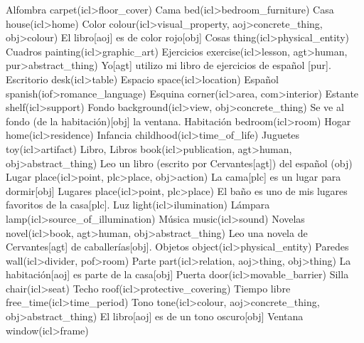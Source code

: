 \documentclass{article}
\begin{document}
{
    \uw
    {Alfombra}
    {carpet(icl>floor\_cover)}
    {}
    \uw
    {Cama}
    {bed(icl>bedroom\_furniture)}
    {}
    \uw
    {Casa}
    {house(icl>home)}
    {}
    \uw
    {Color}
    {colour(icl>visual\_property, aoj>concrete\_thing, obj>colour)}
    {El libro[aoj] es de color rojo[obj]}
    \uw
    {Cosas}
    {thing(icl>physical\_entity)}
    {}
    \uw
    {Cuadros}
    {painting(icl>graphic\_art)}
    {}
    \uw
    {Ejercicios}
    {exercise(icl>lesson, agt>human, pur>abstract\_thing)}
    {Yo[agt] utilizo mi libro de ejercicios de español [pur].}
    \uw
    {Escritorio}
    {desk(icl>table)}
    {}
    \uw
    {Espacio}
    {space(icl>location)}
    {}
    \uw
    {Español}
    {spanish(iof>romance\_language)}
    {}
    \uw
    {Esquina}
    {corner(icl>area, com>interior)}
    {}
    \uw
    {Estante}
    {shelf(icl>support)}
    {}
    \uw
    {Fondo}
    {background(icl>view, obj>concrete\_thing)}
    {Se ve al fondo (de la habitación)[obj] la ventana.}
    \uw
    {Habitación}
    {bedroom(icl>room)}
    {}
    \uw
    {Hogar}
    {home(icl>residence)}
    {}
    \uw
    {Infancia}
    {childhood(icl>time\_of\_life)}
    {}
    \uw
    {Juguetes}
    {toy(icl>artifact)}
    {}
    \uw
    {Libro, Libros}
    {book(icl>publication, agt>human, obj>abstract\_thing)}
    {Leo un libro (escrito por Cervantes[agt]) del español (obj)}
    \uw
    {Lugar}
    {place(icl>point, plc>place, obj>action)}
    {La cama[plc] es un lugar para dormir[obj]}
    \uw
    {Lugares}
    {place(icl>point, plc>place)}
    {El baño es uno de mis lugares favoritos de la casa[plc].}
    \uw
    {Luz}
    {light(icl>ilumination)}
    {}
    \uw
    {Lámpara}
    {lamp(icl>source\_of\_illumination)}
    {}
    \uw
    {Música}
    {music(icl>sound)}
    {}
    \uw
    {Novelas}
    {novel(icl>book, agt>human, obj>abstract\_thing)}
    {Leo una novela de Cervantes[agt] de caballerías[obj].}
    \uw
    {Objetos}
    {object(icl>physical\_entity)}
    {}
    \uw
    {Paredes}
    {wall(icl>divider, pof>room)}
    {}
    \uw
    {Parte}
    {part(icl>relation, aoj>thing, obj>thing)}
    {La habitación[aoj] es parte de la casa[obj]}
    \uw
    {Puerta}
    {door(icl>movable\_barrier)}
    {}
    \uw
    {Silla}
    {chair(icl>seat)}
    {}
    \uw
    {Techo}
    {roof(icl>protective\_covering)}
    {}
    \uw
    {Tiempo libre}
    {free\_time(icl>time\_period)}
    {}
    \uw
    {Tono}
    {tone(icl>colour, aoj>concrete\_thing, obj>abstract\_thing)}
    {El libro[aoj] es de un tono oscuro[obj] }
    \uw
    {Ventana}
    {window(icl>frame)}
    {}
}
\end{document}
